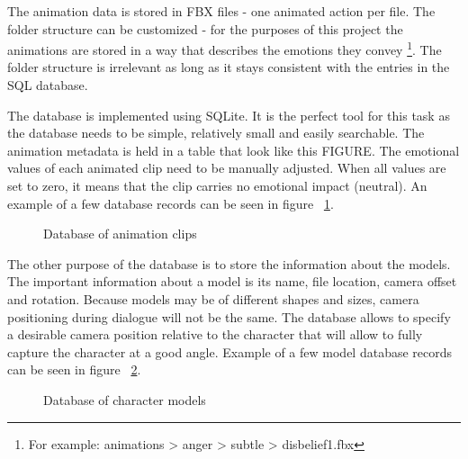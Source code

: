 The animation data is stored in FBX files - one animated action per file. The folder structure can be customized - for the purposes of this project the animations are stored in a way that describes the emotions they convey \footnote{For example: animations > anger > subtle > disbelief1.fbx}. The folder structure is irrelevant as long as it stays consistent with the entries in the SQL database. 

The database is implemented using SQLite. It is the perfect tool for this task as the database needs to be simple, relatively small and easily searchable. The animation metadata is held in a table that look like this FIGURE. The emotional values of each animated clip need to be manually adjusted. When all values are set to zero, it means that the clip carries no emotional impact (neutral). An example of a few database records can be seen in figure ~\ref{fig:db}.

\begin{figure}[H]
\centerline{}
\caption{Database of animation clips}\label{fig:db}
\end{figure}

The other purpose of the database is to store the information about the models. The important information about a model is its name, file location, camera offset and rotation. Because models may be of different shapes and sizes, camera positioning during dialogue will not be the same. The database allows to specify a desirable camera position relative to the character that will allow to fully capture the character at a good angle. Example of a few model database records can be seen in figure ~\ref{fig:dbmodel}.

\begin{figure}[H]
\centerline{}
\caption{Database of character models}\label{fig:dbmodel}
\end{figure}



